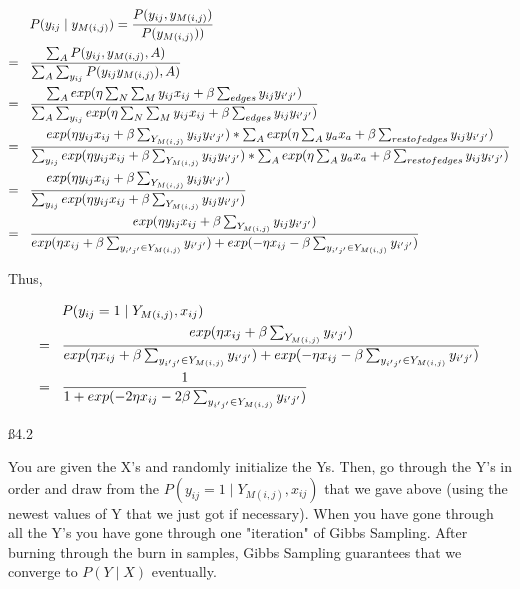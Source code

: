 \begin{align*}
& P(y_{ij} \mid y_{M(i,j)}) = \frac{P(y_{ij}, y_{M(i,j)})}{ P(y_{M(i,j)}))} \\ = \hspace{3 mm} &
\frac{\sum_A P(y_{ij}, y_{M(i,j)}, A)}{ \sum_A \sum_{y_{ij}} P(y_{ij} y_{M(i,j)}),A)} \\ = \hspace{3 mm} &
\frac{\sum_A exp(\eta \sum_N \sum_M y_{ij}x_{ij} +  \beta \sum_{edges} y_{ij}y_{i'j'})}{ \sum_A \sum_{y_{ij}} exp(\eta \sum_N \sum_M y_{ij}x_{ij} +  \beta \sum_{edges} y_{ij}y_{i'j'}) } \\ = \hspace{3 mm} & 
\frac{exp(\eta y_{ij}x_{ij} + \beta \sum_{Y_{M(i,j)}} y_{ij}y_{i'j'}) * \sum_A exp(\eta \sum_A y_a x_a + \beta \sum_{restofedges} y_{ij}y_{i'j'})}{\sum_{y_{ij}} exp(\eta y_{ij}x_{ij} + \beta \sum_{Y_{M(i,j)}} y_{ij}y_{i'j'}) * \sum_A exp(\eta \sum_A y_a x_a + \beta \sum_{restofedges} y_{ij}y_{i'j'})} \\ = \hspace{3 mm} &
\frac{exp(\eta y_{ij}x_{ij} + \beta \sum_{Y_{M(i,j)}} y_{ij}y_{i'j'})}{\sum_{y_{ij}} exp(\eta y_{ij}x_{ij} + \beta \sum_{Y_{M(i,j)}} y_{ij}y_{i'j'})}
\\ = \hspace{3 mm} & \frac{exp(\eta y_{ij}x_{ij} + \beta \sum_{Y_{M(i,j)}} y_{ij}y_{i'j'})}{exp(\eta x_{ij} + \beta \sum_{y_{i'j'} \in Y_{M(i,j)}} y_{i'j'}) + exp(-\eta x_{ij} - \beta \sum_{y_{i'j'} \in Y_{M(i,j)}} y_{i'j'})}
\end{align*}

Thus, 

\begin{align*}
& P(y_{ij} = 1 \mid Y_{M(i,j)}, x_{ij}) \\ = \hspace{3 mm} & \frac{exp(\eta x_{ij} + \beta \sum_{Y_{M(i,j)}} y_{i'j'})}{exp(\eta x_{ij} + \beta \sum_{y_{i'j'} \in Y_{M(i,j)}} y_{i'j'}) + exp(-\eta x_{ij} - \beta \sum_{y_{i'j'} \in Y_{M(i,j)}} y_{i'j'})} \\ = \hspace{3 mm} &
\frac{1}{1+ exp(-2\eta x_{ij} - 2\beta \sum_{y_{i'j'} \in Y_{M(i,j)}} y_{i'j'})}
\end{align*}

\ss {4.2}

You are given the X's and randomly initialize the Ys. Then, go through the Y's in order and draw from the $P(y_{ij} = 1 \mid Y_{M(i,j)}, x_{ij})$ that we gave above (using the newest values of Y that we just got if necessary). When you have gone through all the Y's you have gone through one "iteration" of Gibbs Sampling. After burning through the burn in samples, Gibbs Sampling guarantees that we converge to $P(Y \mid X)$ eventually.

